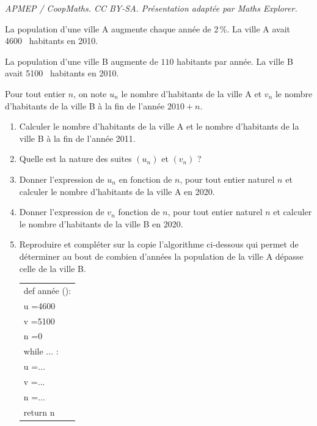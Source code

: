 \documentclass[10pt]{article}
\providecommand{\np}[2][]{{#2~#1}}
\begin{document}
\noindent\textit{APMEP / CoopMaths. CC BY-SA. Présentation adaptée par Maths Explorer.}\par\medskip
\medskip

La population d'une ville A augmente chaque année de 2\,\%. La ville A avait \np{4600} habitants en 2010.

La population d'une ville B augmente de $110$ habitants par année. La ville B avait \np{5100} habitants en 2010.

Pour tout entier $n$, on note $u_n$ le nombre d'habitants de la ville A et $v_n$ le nombre d'habitants de la ville B à la fin de l'année $2010+n$.

\begin{enumerate}
\item  Calculer le nombre d'habitants de la ville A et le nombre d'habitants de la ville B à la fin de l'année 2011.
\item Quelle est la nature des suites $\left(u_n\right)$ et $\left(v_n\right)$ ?
\item Donner l'expression de $u_n$ en fonction de $n$, pour tout entier naturel $n$ et calculer le nombre d'habitants de la ville A en 2020.
\item Donner l'expression de $v_n$ fonction de $n$, pour tout entier naturel $n$ et calculer le nombre d'habitants de la ville B en 2020.
\item Reproduire et compléter sur la copie l'algorithme ci-dessous qui permet de déterminer au bout de combien d'années la population de la ville A dépasse celle de la ville B.

\begin{center}
\begin{tabular}[]{|l|}
\hline
def année ():\\
\hspace{0.6em} u =4600\\
\hspace{0.6em} v =5100\\
\hspace{0.6em} n =0\\
\hspace{0.6em}while ... :\\
\hspace{1em} u =...\\
\hspace{1em} v =...\\
\hspace{1em} n =...\\
return n\\
\hline
\end{tabular}
\end{center}
\end{enumerate}
\vspace{0.75cm}
\end{document}
